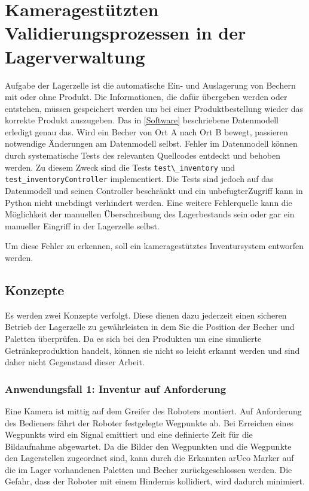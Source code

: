 ﻿\chapter{Kameragestützten Validierungsprozessen in der Lagerverwaltung}\label{KameragestützteInventur}

Aufgabe der Lagerzelle ist die automatische Ein- und Auslagerung von Bechern mit oder ohne Produkt.
Die Informationen, die dafür übergeben werden oder entstehen, müssen gespeichert werden um bei einer Produktbestellung wieder das korrekte Produkt auszugeben.
Das in \ref{Software} beschriebene Datenmodell erledigt genau das. Wird ein Becher von Ort A nach Ort B bewegt, 
passieren notwendige Änderungen am Datenmodell selbst. Fehler im Datenmodell können durch systematische Tests des relevanten Quellcodes entdeckt und behoben werden. 
Zu diesem Zweck sind die Tests \verb|test\_inventory| und \verb|test_inventoryController| implementiert. 
Die Tests sind jedoch auf das Datenmodell und seinen Controller beschränkt und ein \glq unbefugter\grq Zugriff kann in Python nicht unebdingt verhindert werden. 
Eine weitere Fehlerquelle kann die Möglichkeit der manuellen Überschreibung des Lagerbestands sein oder gar ein manueller Eingriff in der Lagerzelle selbst. 

Um diese Fehler zu erkennen, soll ein kameragestütztes Inventursystem entworfen werden. 
    \section {Konzepte}

    Es werden zwei Konzepte verfolgt.
    Diese dienen dazu jederzeit einen sicheren Betrieb der Lagerzelle zu gewährleisten in dem Sie die Position der Becher und Paletten überprüfen.
    Da es sich bei den Produkten um eine simulierte Getränkeproduktion handelt, können sie nicht so leicht erkannt werden und sind daher nicht Gegenstand dieser Arbeit. 

    \subsection{Anwendungsfall 1: Inventur auf Anforderung}\label{InventurAufAnforderung}

    Eine Kamera ist mittig auf dem Greifer des Roboters montiert. Auf Anforderung des Bedieners fährt der Roboter festgelegte Wegpunkte ab. 
    Bei Erreichen eines Wegpunkts wird ein Signal emittiert und eine definierte Zeit für die Bildaufnahme abgewartet.
    Da die Bilder den Wegpunkten und die Wegpunkte den Lagerstellen zugeordnet sind, kann durch die Erkannten arUco Marker auf die 
    im Lager vorhandenen Paletten und Becher zurückgeschlossen werden. 
    Die Gefahr, dass der Roboter mit einem Hindernis kollidiert, wird dadurch minimiert. 

